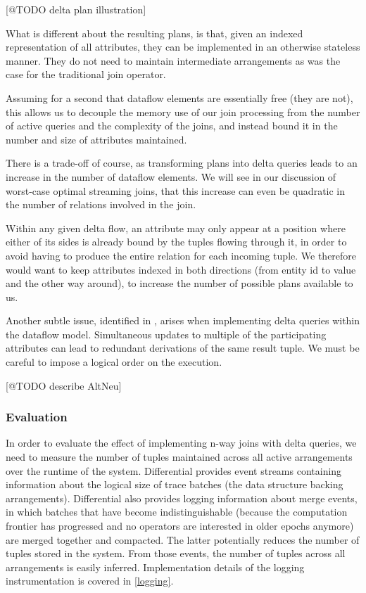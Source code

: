 \documentclass[../catalog.tex]{subfiles}
\begin{document}
[@TODO delta plan illustration]

What is different about the resulting plans, is that, given an indexed
representation of all attributes, they can be implemented in an
otherwise stateless manner. They do not need to maintain intermediate
arrangements as was the case for the traditional join operator.

Assuming for a second that dataflow elements are essentially free
(they are not), this allows us to decouple the memory use of our join
processing from the number of active queries and the complexity of the
joins, and instead bound it in the number and size of attributes
maintained.

There is a trade-off of course, as transforming plans into delta
queries leads to an increase in the number of dataflow elements. We
will see in our discussion of worst-case optimal streaming joins, that
this increase can even be quadratic in the number of relations
involved in the join.

Within any given delta flow, an attribute may only appear at a
position where either of its sides is already bound by the tuples
flowing through it, in order to avoid having to produce the entire
relation for each incoming tuple. We therefore would want to keep
attributes indexed in both directions (from entity id to value and the
other way around), to increase the number of possible plans available
to us.

Another subtle issue, identified in \cite{dogsdogsdogs}, arises when
implementing delta queries within the dataflow model. Simultaneous
updates to multiple of the participating attributes can lead to
redundant derivations of the same result tuple. We must be careful to
impose a logical order on the execution.

[@TODO describe AltNeu]

\subsubsection{Evaluation}

In order to evaluate the effect of implementing n-way joins with delta
queries, we need to measure the number of tuples maintained across all
active arrangements over the runtime of the system. Differential
provides event streams containing information about the logical size
of trace batches (the data structure backing
arrangements). Differential also provides logging information about
merge events, in which batches that have become indistinguishable
(because the computation frontier has progressed and no operators are
interested in older epochs anymore) are merged together and
compacted. The latter potentially reduces the number of tuples stored
in the system. From those events, the number of tuples across all
arrangements is easily inferred. Implementation details of the logging
instrumentation is covered in \ref{logging}.
\end{document}
